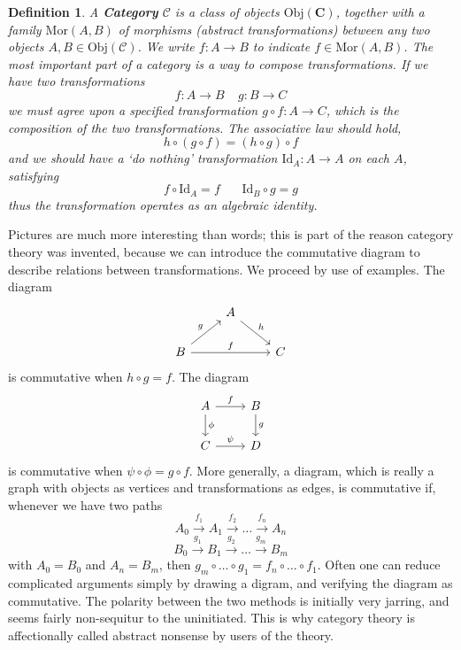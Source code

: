 \documentclass{article}
\theoremstyle{plain}
\newtheorem{definition}{Definition}
\begin{document}
\begin{definition}
    A {\bf Category} $\mathcal{C}$ is a class of objects $\text{Obj}(\mathbf{C})$, together with a family $\text{Mor}(A,B)$ of {\it morphisms} (abstract transformations) between any two objects $A,B \in \text{Obj}(\mathcal{C})$. We write $f: A \to B$ to indicate $f \in \text{Mor}(A,B)$. The most important part of a category is a way to compose transformations. If we have two transformations
    \[ f: A \to B\ \ \ \ \ g: B \to C \]
    we must agree upon a specified transformation $g \circ f: A \to C$, which is the composition of the two transformations. The associative law should hold,
    \[ h \circ (g \circ f) = (h \circ g) \circ f \]
    and we should have a `do nothing' transformation $\text{Id}_A: A \to A$ on each $A$, satisfying
    \[ f \circ \text{Id}_A = f\ \ \ \ \ \ \ \ \text{Id}_B \circ g = g \]
    thus the transformation operates as an algebraic identity.
\end{definition}

Pictures are much more interesting than words; this is part of the reason category theory was invented, because we can introduce the commutative diagram to describe relations between transformations. We proceed by use of examples. The diagram
%
\[
\begin{tikzcd}
     & A \arrow{rd}{h} & \\
    B \arrow{ru}{g} \arrow{rr}{f} & & C
\end{tikzcd}
\]
%
is commutative when $h \circ g = f$. The diagram
%
\[
\begin{tikzcd}
    A \arrow{d}{\phi} \arrow{r}{f} & B \arrow{d}{g}\\
    C \arrow{r}{\psi} & D
\end{tikzcd}
\]
%
is commutative when $\psi \circ \phi = g \circ f$. More generally, a diagram, which is really a graph with objects as vertices and transformations as edges, is commutative if, whenever we have two paths
%
\[ A_0 \xrightarrow{f_1} A_1 \xrightarrow{f_2} \dots \xrightarrow{f_n} A_n \]
\[ B_0 \xrightarrow{g_1} B_1 \xrightarrow{g_2} \dots \xrightarrow{g_m} B_m \]
%
with $A_0 = B_0$ and $A_n = B_m$, then $g_m \circ \dots \circ g_1 = f_n \circ \dots \circ f_1$. Often one can reduce complicated arguments simply by drawing a digram, and verifying the diagram as commutative. The polarity between the two methods is initially very jarring, and seems fairly non-sequitur to the uninitiated. This is why category theory is affectionally called abstract nonsense by users of the theory.
\end{document}
